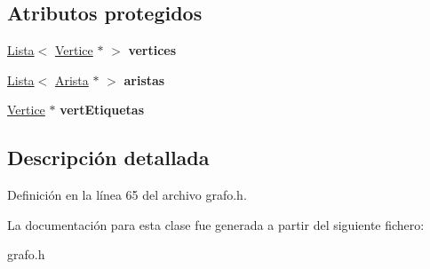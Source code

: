 \subsection*{Atributos protegidos}
\begin{DoxyCompactItemize}
\item 
\mbox{\label{classGrafo_af6719d649fae513eb84ef8bf502c1812}} 
\hyperlink{classLista}{Lista}$<$ \hyperlink{classVertice}{Vertice} $\ast$ $>$ {\bfseries vertices}
\item 
\mbox{\label{classGrafo_a69300beee0528e08e810d91b6f968d02}} 
\hyperlink{classLista}{Lista}$<$ \hyperlink{classArista}{Arista} $\ast$ $>$ {\bfseries aristas}
\item 
\mbox{\label{classGrafo_a67e71aebff46a360d82771b825f71263}} 
\hyperlink{classVertice}{Vertice} $\ast$ {\bfseries vert\+Etiquetas}
\end{DoxyCompactItemize}


\subsection{Descripción detallada}


Definición en la línea 65 del archivo grafo.\+h.



La documentación para esta clase fue generada a partir del siguiente fichero\+:\begin{DoxyCompactItemize}
\item 
grafo.\+h\end{DoxyCompactItemize}

